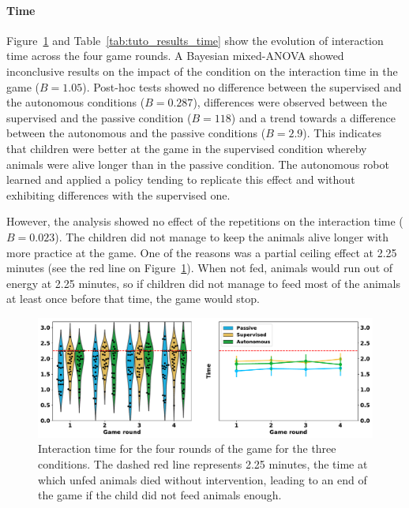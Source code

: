 \paragraph{Time}

Figure~\ref{fig:tutoring_time} and Table~\ref{tab:tuto_results_time} show the evolution of interaction time across the four game rounds. A Bayesian mixed-ANOVA showed inconclusive results on the impact of the condition on the interaction time in the game ($B=1.05$). Post-hoc tests showed no difference between the supervised and the autonomous conditions ($B=0.287$), differences were observed between the supervised and the passive condition ($B=118$) and a trend towards a difference between the autonomous and the passive conditions ($B=2.9$). This indicates that children were better at the game in the supervised condition whereby animals were alive longer than in the passive condition. The autonomous robot learned and applied a policy tending to replicate this effect and without exhibiting differences with the supervised one.

However, the analysis showed no effect of the repetitions on the interaction time ($B=0.023$). The children did not manage to keep the animals alive longer with more practice at the game. One of the reasons was a partial ceiling effect at 2.25 minutes (see the red line on Figure~\ref{fig:tutoring_time}). When not fed, animals would run out of energy at 2.25 minutes, so if children did not manage to feed most of the animals at least once before that time, the game would stop. 

\begin{figure}[ht]
	\includegraphics[width=1\linewidth]{time.pdf}
	\centering
	\caption{Interaction time for the four rounds of the game for the three conditions. The dashed red line represents 2.25 minutes, the time at which unfed animals died without intervention, leading to an end of the game if the child did not feed animals enough.}
	\label{fig:tutoring_time}
\end{figure}

